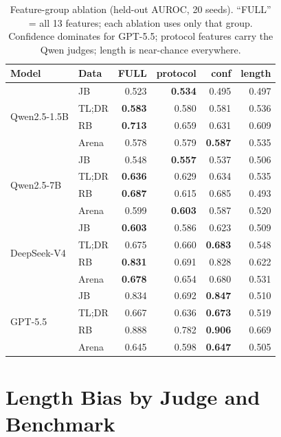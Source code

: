 \begin{table}[t]
\centering
\small
\setlength{\tabcolsep}{3.5pt}
\caption{Feature-group ablation (held-out AUROC, 20 seeds). ``FULL'' = all 13 features; each ablation uses only that group. Confidence dominates for GPT-5.5; protocol features carry the Qwen judges; length is near-chance everywhere.}
\label{tab:featgroup}
\begin{tabular}{llrrrr}
\toprule
Model & Data & \textbf{FULL} & protocol & conf & length \\
\midrule
\multirow{4}{*}{Qwen2.5-1.5B} & JB & 0.523 & \textbf{0.534} & 0.495 & 0.497 \\
 & TL;DR & \textbf{0.583} & 0.580 & 0.581 & 0.536 \\
 & RB & \textbf{0.713} & 0.659 & 0.631 & 0.609 \\
 & Arena & 0.578 & 0.579 & \textbf{0.587} & 0.535 \\
\midrule
\multirow{4}{*}{Qwen2.5-7B} & JB & 0.548 & \textbf{0.557} & 0.537 & 0.506 \\
 & TL;DR & \textbf{0.636} & 0.629 & 0.634 & 0.535 \\
 & RB & \textbf{0.687} & 0.615 & 0.685 & 0.493 \\
 & Arena & 0.599 & \textbf{0.603} & 0.587 & 0.520 \\
\midrule
\multirow{4}{*}{DeepSeek-V4} & JB & \textbf{0.603} & 0.586 & 0.623 & 0.509 \\
 & TL;DR & 0.675 & 0.660 & \textbf{0.683} & 0.548 \\
 & RB & \textbf{0.831} & 0.691 & 0.828 & 0.622 \\
 & Arena & \textbf{0.678} & 0.654 & 0.680 & 0.531 \\
\midrule
\multirow{4}{*}{GPT-5.5} & JB & 0.834 & 0.692 & \textbf{0.847} & 0.510 \\
 & TL;DR & 0.667 & 0.636 & \textbf{0.673} & 0.519 \\
 & RB & 0.888 & 0.782 & \textbf{0.906} & 0.669 \\
 & Arena & 0.645 & 0.598 & \textbf{0.647} & 0.505 \\
\bottomrule
\end{tabular}
\end{table}

\section{Length Bias by Judge and Benchmark}
\label{app:length}

